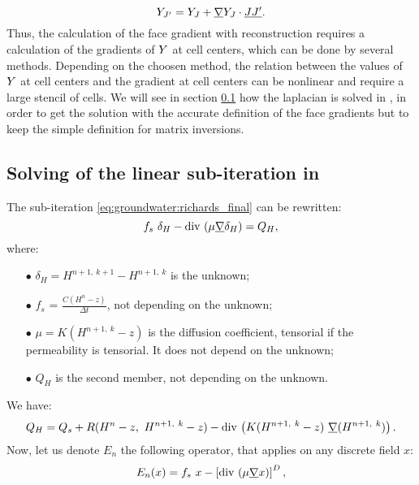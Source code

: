 \begin{equation}
 \label{eq:groundwater:104}
Y_{{J^\prime}} = Y_{J} + \underline{\nabla} Y_J \cdot \underline{J{J^\prime}}.
\end{equation}
Thus, the calculation of the face gradient with reconstruction requires a calculation of the gradients of $Y$ at cell centers, which can be done
by several methods. Depending on the choosen method, the relation between the values of $Y$ at cell centers and the gradient at cell centers can
be nonlinear and require a large stencil of cells. We will see in section \ref{sec:groundwater:solving} how the laplacian is solved in \CS, in order to get the solution
with the accurate definition of the face gradients but to keep the simple definition for matrix inversions.

\subsection{Solving of the linear sub-iteration in \CS} \label{sec:groundwater:solving}
The sub-iteration \eqref{eq:groundwater:richards_final} can be rewritten:
\begin{equation}
 \label{eq:groundwater:solving_1}
{f}_s \ \delta_H - \text{div}\, \left( \mu \underline{\nabla} \delta_H \right) = Q_H,
\end{equation}
where:
\begin{itemize}
\item[$\bullet$] $\delta_H = H^{ n+1, \ k+1} - H^{ n+1, \ k}$ is the unknown;
\item[$\bullet$] $f_s$ = $\frac{C(H^n-z)}{\Delta t}$, not depending on the unknown;
\item[$\bullet$] $\mu = K(H^{ n+1, \ k} - z)$ is the diffusion coefficient, tensorial if the permeability is tensorial. It does not depend on the unknown;
\item[$\bullet$] $Q_H$ is the second member, not depending on the unknown.
\end{itemize}
We have:
\begin{equation}
\label{eq:groundwater:qh}
Q_H = Q_s + R(H^n - z, \ H^{ n+1, \ k} - z) - \dive \left( K(H^{ n+1, \ k} - z) \
\grad(H^{ n+1, \ k}) \right).
\end{equation}
Now, let us denote $E_n$ the following operator, that applies on any discrete field $x$:
\begin{equation}
\label{eq:groundwater:epsilon}
E_n(x) = f_s \ x - \left[ \text{div}\, \left( \mu \underline{\nabla} x \right) \right]^D,
\end{equation}
